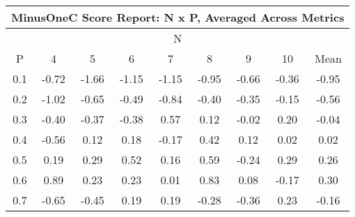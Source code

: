 \begin{longtable}{ | c || c | c | c | c | c | c | c || c |}
\hline
\multicolumn{9}{|c|}{ MinusOneC Score Report: N x P, Averaged Across Metrics } \\
\hline
\multicolumn{9}{|c|}{ N } \\
\hline
P & 4 & 5 & 6 & 7 & 8 & 9 & 10 & Mean\\
\hline
\hline
\endhead
0.1 &  \cellcolor[HTML]{FFEFEF} -0.72 &  \cellcolor[HTML]{FFD7D7} -1.66 &  \cellcolor[HTML]{FFDFDF} -1.15 &  \cellcolor[HTML]{FFDFDF} -1.15 &  \cellcolor[HTML]{FFE7E7} -0.95 &  \cellcolor[HTML]{FFEFEF} -0.66 &  \cellcolor[HTML]{FFF7F7} -0.36 &  \cellcolor[HTML]{FFE7E7} -0.95 \\
0.2 &  \cellcolor[HTML]{FFE7E7} -1.02 &  \cellcolor[HTML]{FFEFEF} -0.65 &  \cellcolor[HTML]{FFEFEF} -0.49 &  \cellcolor[HTML]{FFE7E7} -0.84 &  \cellcolor[HTML]{FFF7F7} -0.40 &  \cellcolor[HTML]{FFF7F7} -0.35 &  \cellcolor[HTML]{FFFFFF} -0.15 &  \cellcolor[HTML]{FFEFEF} -0.56 \\
0.3 &  \cellcolor[HTML]{FFF7F7} -0.40 &  \cellcolor[HTML]{FFF7F7} -0.37 &  \cellcolor[HTML]{FFF7F7} -0.38 &  \cellcolor[HTML]{EFEFFF} 0.57 &  \cellcolor[HTML]{FFFFFF} 0.12 &  \cellcolor[HTML]{FFFFFF} -0.02 &  \cellcolor[HTML]{F7F7FF} 0.20 &  \cellcolor[HTML]{FFFFFF} -0.04 \\
0.4 &  \cellcolor[HTML]{FFEFEF} -0.56 &  \cellcolor[HTML]{FFFFFF} 0.12 &  \cellcolor[HTML]{F7F7FF} 0.18 &  \cellcolor[HTML]{FFF7F7} -0.17 &  \cellcolor[HTML]{F7F7FF} 0.42 &  \cellcolor[HTML]{FFFFFF} 0.12 &  \cellcolor[HTML]{FFFFFF} 0.02 &  \cellcolor[HTML]{FFFFFF} 0.02 \\
0.5 &  \cellcolor[HTML]{F7F7FF} 0.19 &  \cellcolor[HTML]{F7F7FF} 0.29 &  \cellcolor[HTML]{EFEFFF} 0.52 &  \cellcolor[HTML]{F7F7FF} 0.16 &  \cellcolor[HTML]{EFEFFF} 0.59 &  \cellcolor[HTML]{FFF7F7} -0.24 &  \cellcolor[HTML]{F7F7FF} 0.29 &  \cellcolor[HTML]{F7F7FF} 0.26 \\
0.6 &  \cellcolor[HTML]{E7E7FF} 0.89 &  \cellcolor[HTML]{F7F7FF} 0.23 &  \cellcolor[HTML]{F7F7FF} 0.23 &  \cellcolor[HTML]{FFFFFF} 0.01 &  \cellcolor[HTML]{E7E7FF} 0.83 &  \cellcolor[HTML]{FFFFFF} 0.08 &  \cellcolor[HTML]{FFF7F7} -0.17 &  \cellcolor[HTML]{F7F7FF} 0.30 \\
0.7 &  \cellcolor[HTML]{FFEFEF} -0.65 &  \cellcolor[HTML]{FFF7F7} -0.45 &  \cellcolor[HTML]{F7F7FF} 0.19 &  \cellcolor[HTML]{F7F7FF} 0.19 &  \cellcolor[HTML]{FFF7F7} -0.28 &  \cellcolor[HTML]{FFF7F7} -0.36 &  \cellcolor[HTML]{F7F7FF} 0.23 &  \cellcolor[HTML]{FFF7F7} -0.16 \\

\end{longtable}
